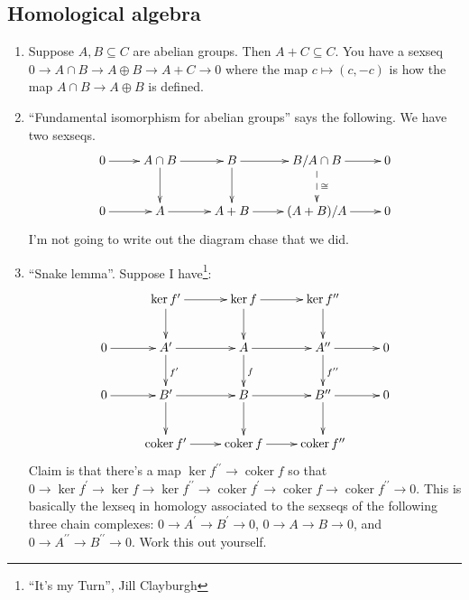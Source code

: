 \documentclass{amsart}
\theoremstyle{theorem}
\theoremstyle{definition}
\DeclareMathOperator{\coker}{coker}
\begin{document}
\subsection{Homological algebra}
\begin{enumerate}
\item Suppose $A,B\subseteq C$ are abelian groups. Then $A+C\subseteq C$. You have a sexseq $0\to A\cap B\to A\oplus B\to A+C\to 0$ where the map $c\mapsto (c,-c)$ is how the map $A\cap B\to A\oplus B$ is defined.
\item ``Fundamental isomorphism for abelian groups'' says the following. We have two sexseqs.
	\begin{equation*}
	\xymatrix{0\ar[r] & A\cap B\ar[r]\ar[d] & B\ar[r]\ar[d] & B/A\cap B\ar[r]\ar@{-->}[d]^\cong & 0\\
	0\ar[r] & A\ar[r] & A+B\ar[r] & (A+B)/A\ar[r] & 0}
	\end{equation*}
	I'm not going to write out the diagram chase that we did.
\item ``Snake lemma''. Suppose I have\footnote{``It's my Turn'', Jill Clayburgh}:
	\begin{equation*}
	\xymatrix{ & \ker f^\prime\ar[r]\ar[d] & \ker f\ar[r]\ar[d] & \ker f^{\prime\prime}\ar[d]\\
	0\ar[r] & A^\prime\ar[r]\ar[d]^{f^\prime} & A\ar[r]\ar[d]^f & A^{\prime\prime}\ar[r]\ar[d]^{f^{\prime\prime}} & 0\\
	0\ar[r] & B^\prime\ar[r]\ar[d] & B\ar[r]\ar[d] & B^{\prime\prime}\ar[r]\ar[d] & 0\\
	 & \coker f^\prime\ar[r] & \coker f\ar[r] & \coker f^{\prime\prime}}
	\end{equation*}
	Claim is that there's a map $\ker f^{\prime\prime}\to\coker f$ so that $0\to \ker f^\prime\to \ker f\to \ker f^{\prime\prime}\to\coker f^\prime\to\coker f\to \coker f^{\prime\prime}\to 0$. This is basically the lexseq in homology associated to the sexseqs of the following three chain complexes: $0\to A^\prime\to B^\prime\to 0$, $0\to A\to B\to 0$, and $0\to A^{\prime\prime}\to B^{\prime\prime}\to 0$. Work this out yourself.
\end{enumerate}
\end{document}

